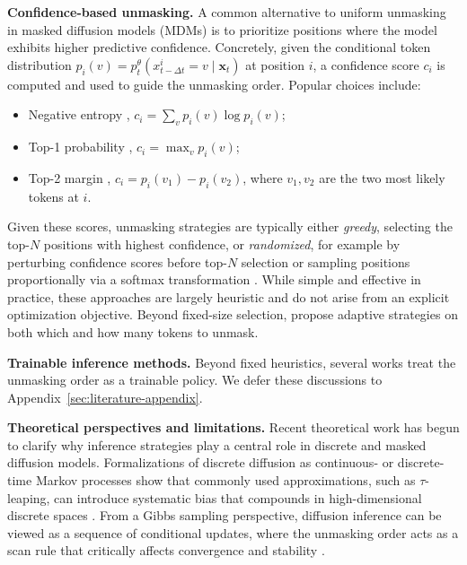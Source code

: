 \textbf{Confidence-based unmasking.}
A common alternative to uniform unmasking in masked diffusion models (MDMs) is to prioritize positions where the model exhibits higher predictive confidence. Concretely, given the conditional token distribution
$p_i(v) = p_t^\theta(x_{t-\Delta t}^i = v \mid \bm x_t)$
at position $i$, a confidence score $c_i$ is computed and used to guide the unmasking order. Popular choices include:
\begin{itemize}[noitemsep, topsep=0pt]
    \item {Negative entropy} \citep{ye2025dream7bdiffusionlarge}, $c_i = \sum_v p_i(v)\log p_i(v)$;
    \item {Top-1 probability} \citep{nie2025scalingmaskeddiffusionmodels}, $c_i = \max_v p_i(v)$;
    \item {Top-2 margin} \citep{kim2025train}, $c_i = p_i(v_1) - p_i(v_2)$, where $v_1, v_2$ are the two most likely tokens at $i$.
\end{itemize}
Given these scores, unmasking strategies are typically either \emph{greedy}, selecting the top-$N$ positions with highest confidence, or \emph{randomized}, for example by perturbing confidence scores before top-$N$ selection \citep{kim2025train} or sampling positions proportionally via a softmax transformation \citep{ye2025dream7bdiffusionlarge}. While simple and effective in practice, these approaches are largely heuristic and do not arise from an explicit optimization objective. Beyond fixed-size selection, \citet{benhamu2025eb,wu2025fastdllm} propose adaptive strategies on both which and how many tokens to unmask.

\textbf{Trainable inference methods.}
Beyond fixed heuristics, several works treat the unmasking order as a trainable policy. We defer these discussions to Appendix~\ref{sec:literature-appendix}. 

\iffalse
\textbf{Theoretical perspectives and limitations.}
Recent theoretical work has begun to clarify why inference strategies play a central role in discrete and masked diffusion models. Formalizations of discrete diffusion as continuous- or discrete-time Markov processes show that commonly used approximations, such as $\tau$-leaping, can introduce systematic bias that compounds in high-dimensional discrete spaces \citep{austin2021structured, campbell2022continuous}. From a Gibbs sampling perspective, diffusion inference can be viewed as a sequence of conditional updates, where the unmasking order acts as a scan rule that critically affects convergence and stability \citep{hayakawa2025demystifying, peng2025path}. 

